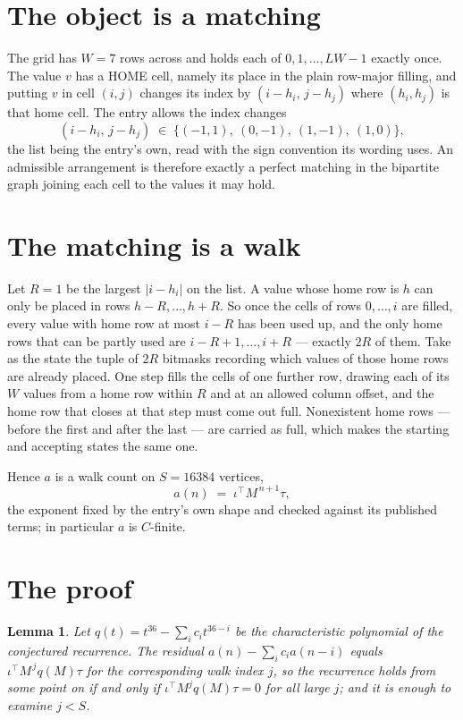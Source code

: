 \documentclass[11pt,a4paper]{article}
\theoremstyle{plain}
\newtheorem{lemma}[theorem]{Lemma}
\theoremstyle{definition}
\begin{document}
\section{The object is a matching}

The grid has $W=7$ rows across and holds each of $0,1,\dots,LW-1$ exactly once. The value
$v$ has a HOME cell, namely its place in the plain row-major filling, and putting $v$ in cell
$(i,j)$ changes its index by $(i-h_i,\,j-h_j)$ where $(h_i,h_j)$ is that home cell. The entry
allows the index changes
\[
(i-h_i,\,j-h_j)\;\in\;\{(-1,1),\ (0,-1),\ (1,-1),\ (1,0)\},
\]
the list being the entry's own, read with the sign convention its wording uses. An admissible
arrangement is therefore exactly a perfect matching in the bipartite graph joining each cell to
the values it may hold.

\section{The matching is a walk}

Let $R=1$ be the largest $|i-h_i|$ on the list. A value whose home row is $h$ can only be
placed in rows $h-R,\dots,h+R$. So once the cells of rows $0,\dots,i$ are filled, every
value with home row at most $i-R$ has been used up, and the only home rows that can be
partly used are $i-R+1,\dots,i+R$ --- exactly $2R$ of them. Take as the state the tuple of
$2R$ bitmasks recording which values of those home rows are already placed. One step fills
the cells of one further row, drawing each of its $W$ values from a home row within $R$
and at an allowed column offset, and the home row that closes at that step must come out
full. Nonexistent home rows --- before the first and after the last --- are carried as
full, which makes the starting and accepting states the same one.

Hence $a$ is a walk count on $S=16384$ vertices,
\[
a(n)\;=\;\iota^{\!\top}M^{\,n+1}\tau ,
\]
the exponent fixed by the entry's own shape and checked against its published terms; in
particular $a$ is $C$-finite.

\section{The proof}

\begin{lemma}\label{lem:crit}
Let $q(t)=t^{36}-\sum_i c_it^{36-i}$ be the characteristic polynomial of the
conjectured recurrence. The residual $a(n)-\sum_ic_ia(n-i)$ equals
$\iota^{\!\top}M^{\,j}q(M)\tau$ for the corresponding walk index $j$, so the recurrence
holds from some point on if and only if $\iota^{\!\top}M^{j}q(M)\tau=0$ for all large $j$;
and it is enough to examine $j<S$.
\end{lemma}
\end{document}
